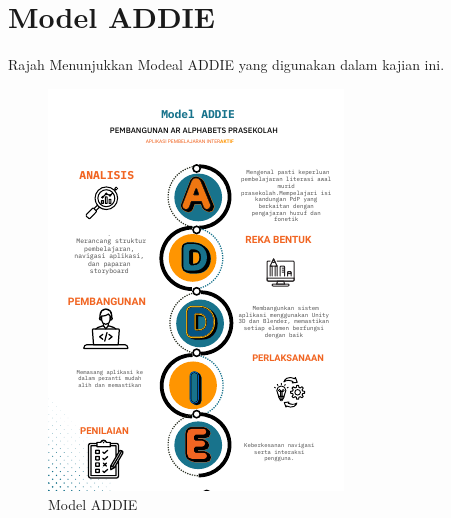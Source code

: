 \section{Model ADDIE}

Rajah Menunjukkan Modeal ADDIE yang digunakan dalam kajian ini.
\begin{figure}[h]
    \centering
    \includegraphics[width=1\linewidth]{MODEL ADDIES.pdf}
    \caption{Model ADDIE}
    \label{fig:enter-addie}
\end{figure}




